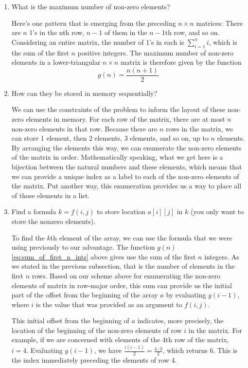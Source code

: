 \documentclass[12pt,letterpaper,final]{report}
\begin{document}
\begin{enumerate}
  \item What is the maximum number of non-zero elements?

        Here's one pattern that is emerging from the preceding $n \times n$ matrices: There are $n$ 1's in the nth row, $n-1$ of them in the $n-1$th row, and so on. Considering an entire matrix, the number of 1's in each is $\sum_{i=1}^{n} i$, which is the sum of the first $n$ positive integers. The maximum number of non-zero elements in a lower-triangular $n \times n$ matrix is therefore given by the function
        \begin{equation}
          g(n) = \frac{n(n+1)}{2} \label{eq:sum_of_first_n_ints}
        \end{equation}
  \item How can they be stored in memory sequentially?

        We can use the constraints of the problem to inform the layout of these non-zero elements in memory. For each row of the matrix, there are at most $n$ non-zero elements in that row. Because there are $n$ rows in the matrix, we can store 1 element, then 2 elements, 3 elements, and so on, up to $n$ elements. By arranging the elements this way, we can enumerate the non-zero elements of the matrix in order. Mathematically speaking, what we get here is a bijection between the natural numbers and these elements, which means that we can provide a unique index as a label to each of the non-zero elements of the matrix. Put another way, this enumeration provides us a way to place all of those elements in a list.
  \item Find a formula $k = f(i,j)$ to store location $a[i][j]$ in $k$ (you only want to store the nonzero elements).

        To find the $k$th element of the array, we can use the formula that we were using previously to our advantage. The function $g(n)$ \eqref{eq:sum_of_first_n_ints} above gives use the sum of the first $n$ integers. As we stated in the previous subsection, that is the number of elements in the first $n$ rows. Based on our scheme above for enumerating the non-zero elements of matrix in row-major order, this sum can provide us the initial part of the offset from the beginning of the array $a$ by evaluating $g(i-1)$, where $i$ is the value that was provided as an argument to $f(i, j)$.

        This initial offset from the beginning of $a$ indicates, more precisely, the location of the beginning of the non-zero elements of row $i$ in the matrix. For example, if we are concerned with elements of the 4th row of the matrix, $i = 4$. Evaluating $g(i-1)$, we have $\frac{i(i-1)}{2} = \frac{4 \cdot 3}{2}$, which returns $6$. This is the index immediately preceding the elements of row 4.


\end{enumerate}
\end{document}
